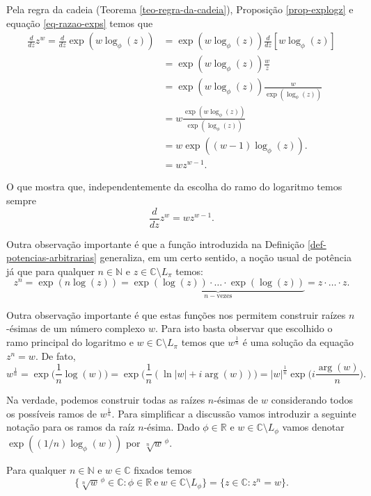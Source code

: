 Pela regra da cadeia (Teorema \ref{teo-regra-da-cadeia}),
Proposição \ref{prop-explogz} e equação \ref{eq-razao-exps} temos que
\begin{align*}
\frac{d}{dz}z^w 
= 
\frac{d}{dz}\exp(w\log_{\phi}(z)) 
&=
\exp(w\log_{\phi}(z))\frac{d}{dz}[w\log_{\phi}(z)]
\\
&=
\exp(w\log_{\phi}(z))\frac{w}{z}
\\
&=
\exp(w\log_{\phi}(z))\frac{w}{\exp(\log_{\phi}(z))}
\\
&=
w\frac{\exp(w\log_{\phi}(z))}{\exp(\log_{\phi}(z))}
\\
&=
w \exp((w-1)\log_{\phi}(z)).
\\
&=
wz^{w-1}.
\end{align*}

O que mostra que, independentemente da escolha do ramo do logaritmo temos sempre 
\[
\frac{d}{dz}z^w = wz^{w-1}.
\]

Outra observação importante é que a função introduzida na 
Definição \ref{def-potencias-arbitrarias} generaliza, em um certo sentido, 
a noção usual de potência já que para qualquer $n\in\mathbb{N}$ e 
$z\in \mathbb{C}\setminus L_{\pi}$ temos: 
\[
z^n  
=  
\exp(n\log(z))
=
\underbrace{\exp(\log(z))\cdot\ldots\cdot\exp(\log(z))}_{n-\mathrm{vezes}}
= z\cdot\ldots\cdot z.
\]

Outra observação importante é que estas funções nos permitem construir raízes 
$n$-ésimas de um número complexo $w$. Para isto basta observar que 
escolhido o ramo principal do logaritmo e
$w\in \mathbb{C}\setminus L_{\pi}$ temos que $w^{\frac{1}{n}}$ é uma
solução da equação $z^n=w$. De fato, 
\[
w^{\frac{1}{n}}
=
\exp\Big(\frac{1}{n}\log(w)\Big)
=
\exp\Big(\frac{1}{n}(\ln|w|+i\arg(w))\Big)
=
|w|^{\frac{1}{n}}\exp\Big(i\frac{\arg(w)}{n}\Big).
\]


Na verdade, podemos construir todas as raízes $n$-ésimas de $w$
considerando todos os possíveis ramos de $w^{\frac{1}{n}}$.
Para simplificar a discussão vamos introduzir a seguinte notação para os
ramos da raíz $n$-ésima. 
Dado $\phi\in\mathbb{R}$ e $w\in \mathbb{C}\setminus L_{\phi}$
vamos denotar $\exp((1/n)\log_{\phi}(w))$ por $\sqrt[n]{w}^{\,\phi}$.
\begin{proposicao}\label{prop-ramos-raizes-raizes-nesimas}
Para qualquer $n\in\mathbb{N}$ e $w\in\mathbb{C}$ fixados temos 
\[
\{ \sqrt[n]{w}^{\,\phi} \in \mathbb{C}: \phi\in\mathbb{R}\ \text{e}\ w\in 
\mathbb{C}\setminus L_{\phi} \}
=
\{ z\in\mathbb{C}: z^n=w\}.
\]
\end{proposicao}


